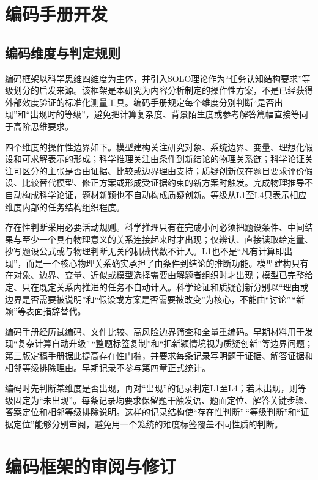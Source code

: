 \documentclass[
  12pt,
  a4paper,twoside,openany]{ctexbook}
\begin{document}
\section{编码手册开发}\label{ux7f16ux7801ux624bux518cux5f00ux53d1}

\subsection{编码维度与判定规则}\label{ux7f16ux7801ux7ef4ux5ea6ux4e0eux5224ux5b9aux89c4ux5219}

编码框架以科学思维四维度为主体，并引入SOLO理论作为``任务认知结构要求''等级划分的启发来源。该框架是本研究为内容分析制定的操作性方案，不是已经获得外部效度验证的标准化测量工具。编码手册规定每个维度分别判断``是否出现''和``出现时的等级''，避免把计算复杂度、背景陌生度或参考解答篇幅直接等同于高阶思维要求。

四个维度的操作性边界如下。模型建构关注研究对象、系统边界、变量、理想化假设和可求解表示的形成；科学推理关注由条件到新结论的物理关系链；科学论证关注可区分的主张是否由证据、比较或边界理由支持；质疑创新仅在题目要求评价假设、比较替代模型、修正方案或形成受证据约束的新方案时触发。完成物理推导不自动构成科学论证，题材新颖也不自动构成质疑创新。等级从L1至L4只表示相应维度内部的任务结构组织程度。

存在性判断采用必要活动规则。科学推理只有在完成小问必须把题设条件、中间结果与至少一个具有物理意义的关系连接起来时才出现；仅辨认、直接读取给定量、抄写题设公式或与物理判断无关的机械代数不计入。L1也不是``凡有计算即出现''，而是一个核心物理关系确实承担了由条件到结论的推断功能。模型建构只有在对象、边界、变量、近似或模型选择需要由解题者组织时才出现；模型已完整给定、只在既定关系内推进的任务不自动计入。科学论证和质疑创新分别以``理由或边界是否需要被说明''和``假设或方案是否需要被改变''为核心，不能由``讨论''\,``新颖''等表面措辞替代。

编码手册经历试编码、文件比较、高风险边界筛查和全量重编码。早期材料用于发现``复杂计算自动升级''\,``整题标签复制''和``把新颖情境视为质疑创新''等边界问题；第三版定稿手册据此提高存在性门槛，并要求每条记录写明题干证据、解答证据和相邻等级排除理由。早期记录不参与第四章正式统计。

编码时先判断某维度是否出现，再对``出现''的记录判定L1至L4；若未出现，则等级固定为``未出现''。每条记录均要求保留题干触发语、题面定位、解答关键步骤、答案定位和相邻等级排除说明。这样的记录结构使``存在性判断''\,``等级判断''和``证据定位''能够分别审阅，避免用一个笼统的难度标签覆盖不同性质的判断。

\section{编码框架的审阅与修订}\label{ux7f16ux7801ux6846ux67b6ux7684ux5ba1ux9605ux4e0eux4feeux8ba2}
\end{document}
